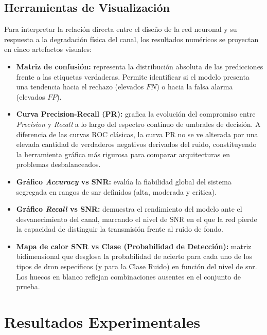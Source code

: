 \subsection{Herramientas de Visualización}
\label{subsec:eval_artefactos}

Para interpretar la relación directa entre el diseño de la red neuronal y su respuesta a la degradación física del canal, los resultados numéricos se proyectan en cinco artefactos visuales:

\begin{itemize}
    \item \textbf{Matriz de confusión:} representa la distribución absoluta de las predicciones frente a las etiquetas verdaderas. Permite identificar si el modelo presenta una tendencia hacia el rechazo (elevados $FN$) o hacia la falsa alarma (elevados $FP$).
    
    \item \textbf{Curva Precision-Recall (PR):} grafica la evolución del compromiso entre \textit{Precision} y \textit{Recall} a lo largo del espectro continuo de umbrales de decisión. A diferencia de las curvas ROC clásicas, la curva PR no se ve alterada por una elevada cantidad de verdaderos negativos derivados del ruido, constituyendo la herramienta gráfica más rigurosa para comparar arquitecturas en problemas desbalanceados.
    
    \item \textbf{Gráfico \textit{Accuracy} vs SNR:} evalúa la fiabilidad global del sistema segregada en rangos de \gls{snr} definidos (alta, moderada y crítica).
    
    \item \textbf{Gráfico \textit{Recall} vs SNR:} demuestra el rendimiento del modelo ante el desvanecimiento del canal, marcando el nivel de SNR en el que la red pierde la capacidad de distinguir la transmisión frente al ruido de fondo.
    
    \item \textbf{Mapa de calor SNR vs Clase (Probabilidad de Detección):} matriz bidimensional que desglosa la probabilidad de acierto para cada uno de los tipos de dron específicos (y para la Clase Ruido) en función del nivel de \gls{snr}. Los huecos en blanco reflejan combinaciones ausentes en el conjunto de prueba.
\end{itemize}

\section{Resultados Experimentales}
\label{sec:resultados_experimentales}

